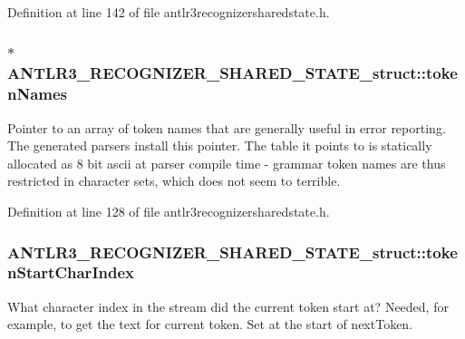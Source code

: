 Definition at line 142 of file antlr3recognizersharedstate.\-h.

\hypertarget{struct_a_n_t_l_r3___r_e_c_o_g_n_i_z_e_r___s_h_a_r_e_d___s_t_a_t_e__struct_afe849bde6001bff384eb6b090c9b01e3}{
\subsubsection[{token\-Names}]{$\ast$ A\-N\-T\-L\-R3\-\_\-\-R\-E\-C\-O\-G\-N\-I\-Z\-E\-R\-\_\-\-S\-H\-A\-R\-E\-D\-\_\-\-S\-T\-A\-T\-E\-\_\-struct\-::token\-Names}}\label{struct_a_n_t_l_r3___r_e_c_o_g_n_i_z_e_r___s_h_a_r_e_d___s_t_a_t_e__struct_afe849bde6001bff384eb6b090c9b01e3}
Pointer to an array of token names that are generally useful in error reporting. The generated parsers install this pointer. The table it points to is statically allocated as 8 bit ascii at parser compile time -\/ grammar token names are thus restricted in character sets, which does not seem to terrible. 

Definition at line 128 of file antlr3recognizersharedstate.\-h.

\hypertarget{struct_a_n_t_l_r3___r_e_c_o_g_n_i_z_e_r___s_h_a_r_e_d___s_t_a_t_e__struct_aa746ab83b70d8b5fdfce16175ad5da85}{
\subsubsection[{token\-Start\-Char\-Index}]{ A\-N\-T\-L\-R3\-\_\-\-R\-E\-C\-O\-G\-N\-I\-Z\-E\-R\-\_\-\-S\-H\-A\-R\-E\-D\-\_\-\-S\-T\-A\-T\-E\-\_\-struct\-::token\-Start\-Char\-Index}}\label{struct_a_n_t_l_r3___r_e_c_o_g_n_i_z_e_r___s_h_a_r_e_d___s_t_a_t_e__struct_aa746ab83b70d8b5fdfce16175ad5da85}
What character index in the stream did the current token start at? Needed, for example, to get the text for current token. Set at the start of next\-Token. 

